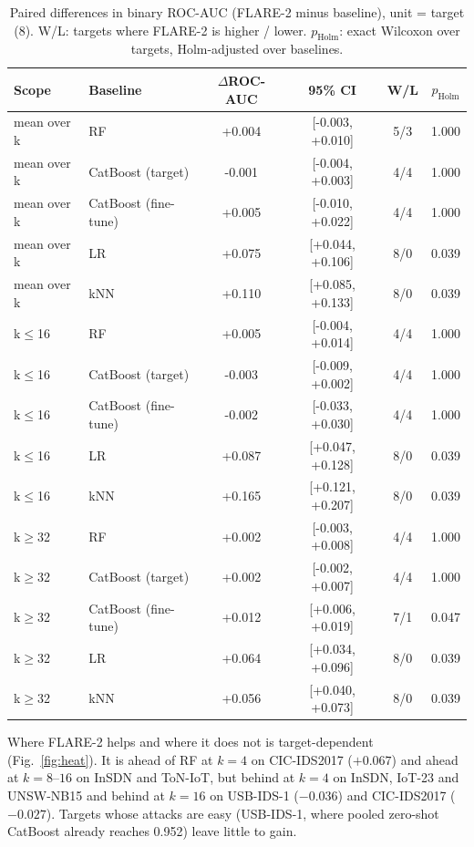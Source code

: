 \documentclass[pdflatex,sn-mathphys-num]{sn-jnl}%
\begin{document}
\begin{table}[htbp]
\centering\small
\caption{Paired differences in binary ROC-AUC (FLARE-2 minus baseline), unit = target (8). W/L: targets where FLARE-2 is higher / lower. $p_{\text{Holm}}$: exact Wilcoxon over targets, Holm-adjusted over baselines.}\label{tab:stats}
{\scriptsize\setlength{\tabcolsep}{2.5pt}\begin{tabular}{llcccc}
\toprule
Scope & Baseline & $\Delta$ROC-AUC & 95\% CI & W/L & $p_{\text{Holm}}$ \\
\midrule
mean over k & RF & +0.004 & [-0.003, +0.010] & 5/3 & 1.000 \\
mean over k & CatBoost (target) & -0.001 & [-0.004, +0.003] & 4/4 & 1.000 \\
mean over k & CatBoost (fine-tune) & +0.005 & [-0.010, +0.022] & 4/4 & 1.000 \\
mean over k & LR & +0.075 & [+0.044, +0.106] & 8/0 & 0.039 \\
mean over k & kNN & +0.110 & [+0.085, +0.133] & 8/0 & 0.039 \\
k$\leq$16 & RF & +0.005 & [-0.004, +0.014] & 4/4 & 1.000 \\
k$\leq$16 & CatBoost (target) & -0.003 & [-0.009, +0.002] & 4/4 & 1.000 \\
k$\leq$16 & CatBoost (fine-tune) & -0.002 & [-0.033, +0.030] & 4/4 & 1.000 \\
k$\leq$16 & LR & +0.087 & [+0.047, +0.128] & 8/0 & 0.039 \\
k$\leq$16 & kNN & +0.165 & [+0.121, +0.207] & 8/0 & 0.039 \\
k$\geq$32 & RF & +0.002 & [-0.003, +0.008] & 4/4 & 1.000 \\
k$\geq$32 & CatBoost (target) & +0.002 & [-0.002, +0.007] & 4/4 & 1.000 \\
k$\geq$32 & CatBoost (fine-tune) & +0.012 & [+0.006, +0.019] & 7/1 & 0.047 \\
k$\geq$32 & LR & +0.064 & [+0.034, +0.096] & 8/0 & 0.039 \\
k$\geq$32 & kNN & +0.056 & [+0.040, +0.073] & 8/0 & 0.039 \\
\bottomrule
\end{tabular}}
\end{table}

Where FLARE-2 helps and where it does not is target-dependent (Fig.~\ref{fig:heat}).
It is ahead of RF at $k=4$ on CIC-IDS2017 ($+0.067$) and ahead at $k=8$--$16$ on InSDN and ToN-IoT, but behind at $k=4$ on InSDN, IoT-23 and UNSW-NB15 and behind at $k=16$ on USB-IDS-1 ($-0.036$) and CIC-IDS2017 ($-0.027$).
Targets whose attacks are easy (USB-IDS-1, where pooled zero-shot CatBoost already reaches 0.952) leave little to gain.
\end{document}
